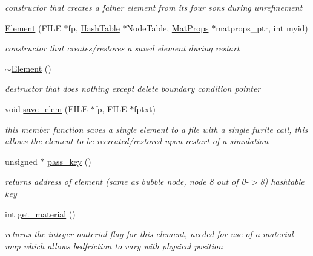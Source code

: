 \begin{CompactItemize}
\begin{CompactList}\small\item\em constructor that creates a father element from its four sons during unrefinement \item\end{CompactList}\item 
\hyperlink{classElement_a4}{Element} (FILE $\ast$fp, \hyperlink{classHashTable}{Hash\-Table} $\ast$Node\-Table, \hyperlink{structMatProps}{Mat\-Props} $\ast$matprops\_\-ptr, int myid)
\begin{CompactList}\small\item\em constructor that creates/restores a saved element during restart \item\end{CompactList}\item 
\hyperlink{classElement_a5}{$\sim$Element} ()
\begin{CompactList}\small\item\em destructor that does nothing except delete boundary condition pointer \item\end{CompactList}\item 
void \hyperlink{classElement_a6}{save\_\-elem} (FILE $\ast$fp, FILE $\ast$fptxt)
\begin{CompactList}\small\item\em this member function saves a single element to a file with a single fwrite call, this allows the element to be recreated/restored upon restart of a simulation \item\end{CompactList}\item 
unsigned $\ast$ \hyperlink{classElement_a7}{pass\_\-key} ()
\begin{CompactList}\small\item\em returns address of element (same as bubble node, node 8 out of 0-$>$8) hashtable key \item\end{CompactList}\item 
int \hyperlink{classElement_a8}{get\_\-material} ()
\begin{CompactList}\small\item\em returns the integer material flag for this element, needed for use of a material map which allows bedfriction to vary with physical position \item\end{CompactList}\item 

\end{CompactItemize}
